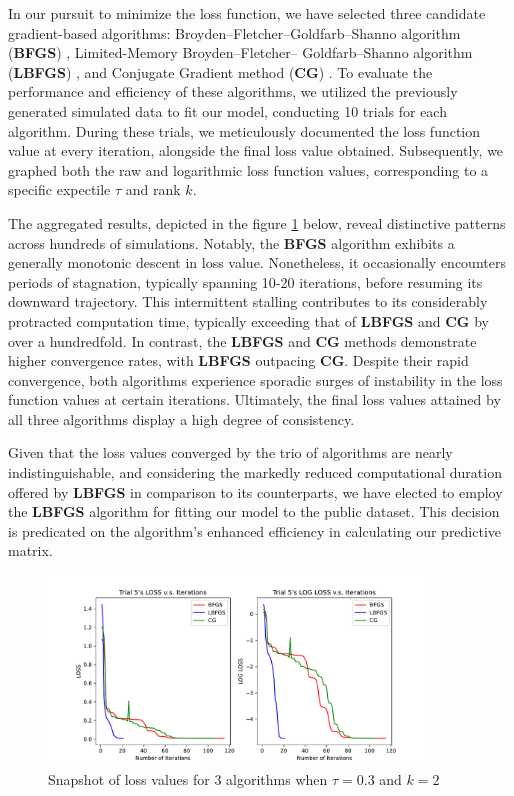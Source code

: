 \documentclass{article}
\begin{document}
In our pursuit to minimize the loss function, we have selected three candidate gradient-based algorithms: Broyden–Fletcher–Goldfarb–Shanno algorithm (\textbf{BFGS}) \cite{35d0019d-775a-3628-b0b4-67be112e346b}, Limited-Memory Broyden–Fletcher– Goldfarb–Shanno algorithm (\textbf{LBFGS}) \cite{liu1989limited}, and Conjugate Gradient method (\textbf{CG}) \cite{hestenes1952methods}. To evaluate the performance and efficiency of these algorithms, we utilized the previously generated simulated data to fit our model, conducting 10 trials for each algorithm. During these trials, we meticulously documented the loss function value at every iteration, alongside the final loss value obtained. Subsequently, we graphed both the raw and logarithmic loss function values, corresponding to a specific expectile $\tau$ and rank $k$.

The aggregated results, depicted in the figure \ref{lossfigure_comparison} below, reveal distinctive patterns across hundreds of simulations. Notably, the \textbf{BFGS} algorithm exhibits a generally monotonic descent in loss value. Nonetheless, it occasionally encounters periods of stagnation, typically spanning 10-20 iterations, before resuming its downward trajectory. This intermittent stalling contributes to its considerably protracted computation time, typically exceeding that of \textbf{LBFGS} and \textbf{CG} by over a hundredfold. In contrast, the \textbf{LBFGS} and \textbf{CG} methods demonstrate higher convergence rates, with \textbf{LBFGS} outpacing \textbf{CG}. Despite their rapid convergence, both algorithms experience sporadic surges of instability in the loss function values at certain iterations. Ultimately, the final loss values attained by all three algorithms display a high degree of consistency.

Given that the loss values converged by the trio of algorithms are nearly indistinguishable, and considering the markedly reduced computational duration offered by \textbf{LBFGS} in comparison to its counterparts, we have elected to employ the \textbf{LBFGS} algorithm for fitting our model to the public dataset. This decision is predicated on the algorithm's enhanced efficiency in calculating our predictive matrix.

\begin{figure}[ht]
    \centering
    \includegraphics[width=0.9\textwidth]{lossfigure.pdf}
    \caption{Snapshot of loss values for 3 algorithms when $\tau = 0.3$ and $k = 2$}
    \label{lossfigure_comparison}
\end{figure}
\FloatBarrier
\end{document}
